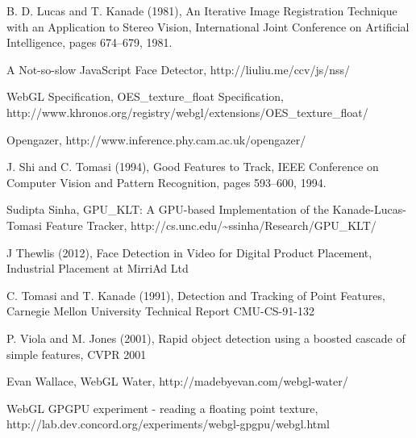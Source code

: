 \documentclass[a4paper]{article}
\begin{document}
\begin{thebibliography}{9}
  B. D. Lucas and T. Kanade (1981),
  An Iterative Image Registration Technique with an Application to Stereo Vision,  
  International Joint Conference on Artificial Intelligence, pages 674–679, 1981.


 A Not-so-slow JavaScript Face Detector,
 http://liuliu.me/ccv/js/nss/


  WebGL Specification,
  OES\_texture\_float Specification,
  http://www.khronos.org/registry/webgl/extensions/OES\_texture\_float/

  Opengazer,
  http://www.inference.phy.cam.ac.uk/opengazer/

  J. Shi and C. Tomasi (1994),
  Good Features to Track,
  IEEE Conference on Computer Vision and Pattern Recognition, pages 593–600, 1994.

  Sudipta Sinha,
  GPU\_KLT: A GPU-based Implementation of the Kanade-Lucas-Tomasi Feature Tracker,
  http://cs.unc.edu/\textasciitilde ssinha/Research/GPU\_KLT/

  J Thewlis (2012),
  Face Detection in Video for Digital Product Placement,
  Industrial Placement at MirriAd Ltd

  C. Tomasi and T. Kanade (1991),
  Detection and Tracking of Point Features,
  Carnegie Mellon University Technical Report CMU-CS-91-132

  P. Viola and M. Jones (2001),
  Rapid object detection using a boosted cascade of simple features,
  CVPR 2001


  Evan Wallace,
  WebGL Water,
  http://madebyevan.com/webgl-water/
  

  WebGL GPGPU experiment - reading a floating point texture,
  http://lab.dev.concord.org/experiments/webgl-gpgpu/webgl.html





\end{thebibliography}
\end{document}
